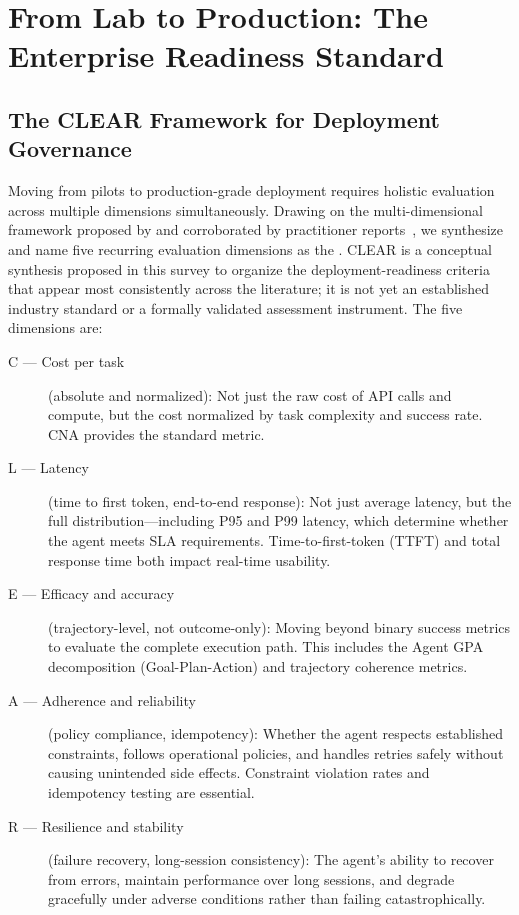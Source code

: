 \section{From Lab to Production: The Enterprise Readiness Standard}
\label{sec:enterprise}

\subsection{The CLEAR Framework for Deployment Governance}

Moving from pilots to production-grade deployment requires holistic evaluation across multiple dimensions simultaneously. Drawing on the multi-dimensional framework proposed by \citet{beyond_accuracy} and corroborated by practitioner reports~\citep{aws_evaluating_agents, production_ready_agentic}, we synthesize and name five recurring evaluation dimensions as the . CLEAR is a conceptual synthesis proposed in this survey to organize the deployment-readiness criteria that appear most consistently across the literature; it is not yet an established industry standard or a formally validated assessment instrument. The five dimensions are:

\begin{description}
    \item[C --- Cost per task] (absolute and normalized): Not just the raw cost of API calls and compute, but the cost normalized by task complexity and success rate. CNA provides the standard metric.
    \item[L --- Latency] (time to first token, end-to-end response): Not just average latency, but the full distribution---including P95 and P99 latency, which determine whether the agent meets SLA requirements. Time-to-first-token (TTFT) and total response time both impact real-time usability.
    \item[E --- Efficacy and accuracy] (trajectory-level, not outcome-only): Moving beyond binary success metrics to evaluate the complete execution path. This includes the Agent GPA decomposition (Goal-Plan-Action) and trajectory coherence metrics.
    \item[A --- Adherence and reliability] (policy compliance, idempotency): Whether the agent respects established constraints, follows operational policies, and handles retries safely without causing unintended side effects. Constraint violation rates and idempotency testing are essential.
    \item[R --- Resilience and stability] (failure recovery, long-session consistency): The agent's ability to recover from errors, maintain performance over long sessions, and degrade gracefully under adverse conditions rather than failing catastrophically.
\end{description}

